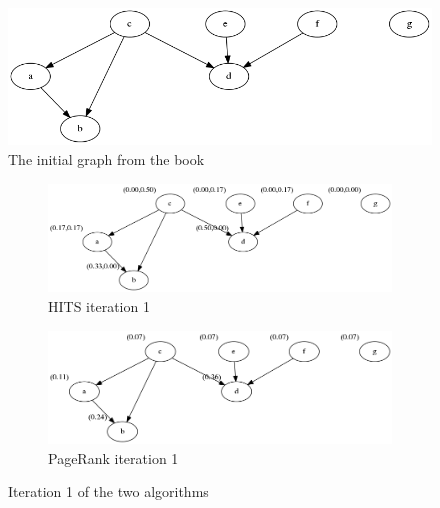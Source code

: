 \documentclass{article}
\begin{document}
\begin{figure}[h]
	 \centering
	\includegraphics[width=.5\linewidth]{init.png}
	\caption{The initial graph from the book}
	\label{fig:init_graph}
	\end{figure}
	\begin{figure}[]
	\centering
	\begin{subfigure}{.5\textwidth}
	  \centering
	  \includegraphics[width=\linewidth]{HITS_it1.png}
	  \caption{HITS iteration 1}
	  \label{}
	\end{subfigure}%
	\begin{subfigure}{.5\textwidth}
	  \centering
	  \includegraphics[width=\linewidth]{PR_graph_iter_1.png}
	  \caption{PageRank iteration 1}
	  \label{}
	\end{subfigure}
	\caption{Iteration 1 of the two algorithms}
	\label{fig:PR_HITS_it1}
	\end{figure}
\end{document}
